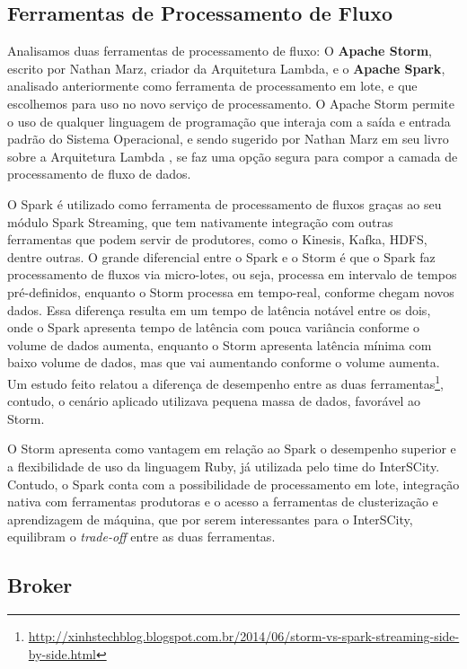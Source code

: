 
\subsection{Ferramentas de Processamento de Fluxo}

Analisamos duas ferramentas de processamento de fluxo: O
\textbf{Apache Storm}, escrito por Nathan Marz, criador da Arquitetura
Lambda, e o \textbf{Apache Spark}, analisado anteriormente como ferramenta de
processamento em lote, e que escolhemos para uso no novo serviço de
processamento. O Apache Storm permite o uso de qualquer
linguagem de programação que interaja com a saída e entrada padrão do Sistema
Operacional, e sendo sugerido por Nathan Marz em seu livro sobre a Arquitetura
Lambda \cite{marz2015}, se faz uma opção segura para compor a camada
de processamento de fluxo de dados.

O Spark é utilizado como ferramenta de processamento de fluxos graças ao seu módulo
Spark Streaming, que tem nativamente integração com outras ferramentas que
podem servir de produtores, como o Kinesis, Kafka, HDFS, dentre outras. O
grande diferencial entre o Spark e o Storm é que o Spark faz processamento
de fluxos via micro-lotes, ou seja, processa em intervalo
de tempos pré-definidos, enquanto o Storm processa em tempo-real, conforme
chegam novos dados. Essa diferença resulta em um tempo de latência notável
entre os dois, onde o Spark apresenta tempo de latência com pouca variância
conforme o volume de dados aumenta, enquanto o Storm apresenta latência mínima
com baixo volume de dados, mas que vai aumentando conforme o volume aumenta.
Um estudo feito relatou a diferença de desempenho entre as duas
ferramentas\footnote{\url{http://xinhstechblog.blogspot.com.br/2014/06/storm-vs-spark-streaming-side-by-side.html}},
contudo, o cenário aplicado utilizava pequena massa de dados, favorável ao
Storm.

O Storm apresenta como vantagem em relação ao Spark o desempenho
superior e a flexibilidade de uso da linguagem Ruby, já utilizada pelo time
do InterSCity. Contudo, o Spark conta com a possibilidade de processamento
em lote, integração nativa com ferramentas produtoras e o acesso a
ferramentas de clusterização e aprendizagem de máquina, que por serem
interessantes para o InterSCity, equilibram o \textit{trade-off} entre as
duas ferramentas.

\subsection{Broker}


